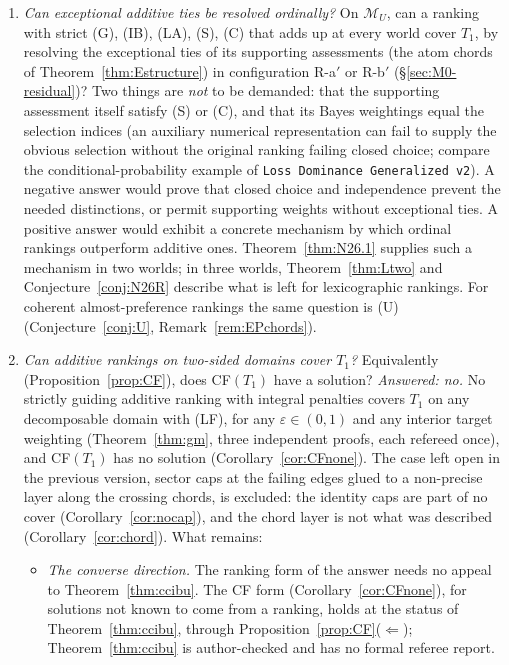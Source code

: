 \documentclass[11pt]{article}
\theoremstyle{definition}
\theoremstyle{remark}
\newcommand{\M}{\mathcal M}
\newcommand{\src}[1]{\texttt{#1}}
\begin{document}
\begin{enumerate}[leftmargin=*,label=\textbf{(Q\arabic*)}]
\item \emph{Can exceptional additive ties be resolved ordinally?} On $\M_U$, can a ranking with strict (G), (IB), (LA), (S), (C) that adds up at every world cover $T_1$, by resolving the exceptional ties of its supporting assessments (the atom chords of Theorem~\ref{thm:Estructure}) in configuration R-a$'$ or R-b$'$ (\S\ref{sec:M0-residual})? Two things are \emph{not} to be demanded: that the supporting assessment itself satisfy (S) or (C), and that its Bayes weightings equal the selection indices (an auxiliary numerical representation can fail to supply the obvious selection without the original ranking failing closed choice; compare the conditional-probability example of \src{Loss Dominance Generalized v2}). A negative answer would prove that closed choice and independence prevent the needed distinctions, or permit supporting weights without exceptional ties. A positive answer would exhibit a concrete mechanism by which ordinal rankings outperform additive ones. Theorem~\ref{thm:N26.1} supplies such a mechanism in two worlds; in three worlds, Theorem~\ref{thm:Ltwo} and Conjecture~\ref{conj:N26R} describe what is left for lexicographic rankings. For coherent almost-preference rankings the same question is (U) (Conjecture~\ref{conj:U}, Remark~\ref{rem:EPchords}).
\item \emph{Can additive rankings on two-sided domains cover $T_1$?} Equivalently (Proposition~\ref{prop:CF}), does CF$(T_1)$ have a solution? \emph{Answered: no.} No strictly guiding additive ranking with integral penalties covers $T_1$ on any decomposable domain with (LF), for any $\varepsilon\in(0,1)$ and any interior target weighting (Theorem~\ref{thm:gm}, three independent proofs, each refereed once), and CF$(T_1)$ has no solution (Corollary~\ref{cor:CFnone}). The case left open in the previous version, sector caps at the failing edges glued to a non-precise layer along the crossing chords, is excluded: the identity caps are part of no cover (Corollary~\ref{cor:nocap}), and the chord layer is not what was described (Corollary~\ref{cor:chord}). What remains:
\begin{itemize}[leftmargin=*]
\item \emph{The converse direction.} The ranking form of the answer needs no appeal to Theorem~\ref{thm:ccibu}. The CF form (Corollary~\ref{cor:CFnone}), for solutions not known to come from a ranking, holds at the status of Theorem~\ref{thm:ccibu}, through Proposition~\ref{prop:CF}($\Leftarrow$); Theorem~\ref{thm:ccibu} is author-checked and has no formal referee report.

\end{itemize}
\end{enumerate}
\end{document}
